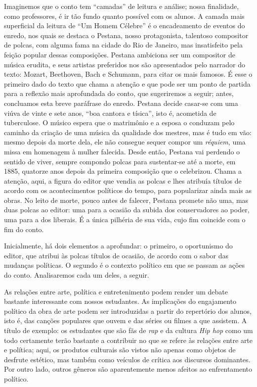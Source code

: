 \documentclass[11pt]{extarticle}
\begin{document}
Imaginemos que o conto tem ``camadas'' de leitura e análise; nossa
finalidade, como professores, é ir tão fundo quanto possível com os
alunos. A camada mais superficial da leitura de ``Um Homem Célebre'' é o
encadeamento de eventos do enredo, nos quais se destaca o Pestana, nosso
protagonista, talentoso compositor de polcas, com alguma fama na cidade
do Rio de Janeiro, mas insatisfeito pela feição popular dessas
composições. Pestana ambiciona ser um compositor de música erudita, e
seus artistas preferidos nos são apresentados pelo narrador do texto:
Mozart, Beethoven, Bach e Schumann, para citar os mais famosos. É esse o
primeiro dado do texto que chama a atenção e que pode ser um ponto de
partida para a reflexão mais aprofundada do conto, que sugeriremos a
seguir; antes, concluamos esta breve paráfrase do enredo. Pestana decide
casar-se com uma viúva de vinte e sete anos, ``boa cantora e tísica'',
isto é, acometida de tuberculose. O músico espera que o matrimônio e a
esposa o conduzam pelo caminho da criação de uma música da qualidade dos
mestres, mas é tudo em vão: mesmo depois da morte dela, ele não consegue
sequer compor um \emph{réquiem}, uma missa em homenagem à mulher
falecida. Desde então, Pestana vai perdendo o sentido de viver, sempre
compondo polcas para sustentar-se até a morte, em 1885, quatorze anos
depois da primeira composição que o celebrizou. Chama a atenção, aqui, a
figura do editor que vendia as polcas e lhes atribuía títulos de acordo
com os acontecimentos políticos do tempo, para popularizar ainda mais as
obras. No leito de morte, pouco antes de falecer, Pestana promete não
uma, mas duas polcas ao editor: uma para a ocasião da subida dos
conservadores ao poder, uma para a dos liberais. É a única pilhéria de
sua vida, cujo fim coincide com o fim do conto.


Inicialmente, há dois elementos a aprofundar: o primeiro, o oportunismo
do editor, que atribui às polcas títulos de ocasião, de acordo com o
sabor das mudanças políticas. O segundo é o contexto político em que se
passam as ações do conto. Analisaremos cada um deles, a seguir.

As relações entre arte, política e entretenimento podem render um debate
bastante interessante com nossos estudantes. As implicações do
engajamento político da obra de arte podem ser introduzidas a partir do
repertório dos alunos, isto é, das canções populares que ouvem e das
séries ou filmes a que assistem. A título de exemplo: os estudantes que
são fãs de \emph{rap} e da cultura \emph{Hip hop} como um todo
certamente terão bastante a contribuir no que se refere às relações
entre arte e política; aqui, os produtos culturais são vistos não apenas
como objetos de desfrute estético, mas também como veículos de crítica
aos discursos dominantes. Por outro lado, outros gêneros são
aparentemente menos afeitos ao enfrentamento político.
\end{document}
